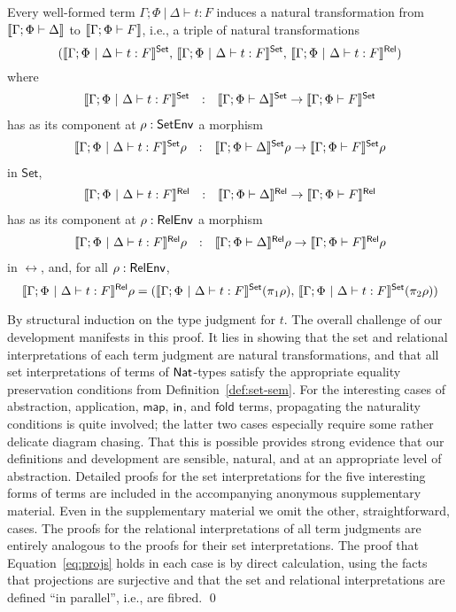 \documentclass{lmcs}
\theoremstyle{plain}\newtheorem{satz}[thm]{Satz}
\newcommand{\fold}{\mathsf{fold}}
\newcommand{\set}{\mathsf{Set}}
\newcommand{\map}{\mathsf{map}}
\begin{document}
\begin{thm}\label{thm:at-gen}
Every well-formed term $\Gamma;\Phi~|~\Delta \vdash t : F$ induces
a natural transformation from $\llbracket{\Gamma; \Phi \vdash \Delta}\rrbracket$ to
$\llbracket{\Gamma; \Phi \vdash F}\rrbracket$, i.e., a triple of natural
transformations 
\[(\setsem{\Gamma;\Phi~|~\Delta \vdash t : F},\,
\setsem{\Gamma;\Phi~|~\Delta \vdash t : F},\,
\relsem{\Gamma;\Phi~|~\Delta \vdash t : F})\]
where
\[\begin{array}{lll}
\setsem{\Gamma;\Phi~|~\Delta \vdash t : F} & : & \setsem{\Gamma;
  \Phi \vdash \Delta} \to \setsem{\Gamma; \Phi \vdash F}
\end{array}\]
has as its component at $\rho : \mathsf{SetEnv}$ a morphism
\[\begin{array}{lll}
\setsem{\Gamma;\Phi~|~\Delta \vdash t : F}\rho & : & \setsem{\Gamma;
  \Phi \vdash \Delta}\rho \to \setsem{\Gamma; \Phi \vdash F}\rho
\end{array}\]
in $\set$,
\[\begin{array}{lll}
\llbracket{\Gamma;\Phi~|~\Delta \vdash t : F}\rrbracket^{\mathsf{Rel}} & : & \llbracket{\Gamma;
  \Phi \vdash \Delta}\rrbracket^{\mathsf{Rel}} \to \llbracket{\Gamma; \Phi \vdash F}\rrbracket^{\mathsf{Rel}}
\end{array}\]
has as its component at $\rho : \mathsf{RelEnv}$ a morphism
\[\begin{array}{lll}
\llbracket{\Gamma;\Phi~|~\Delta \vdash t : F}\rrbracket^{\mathsf{Rel}}\rho & : & \llbracket{\Gamma;
  \Phi \vdash \Delta}\rrbracket^{\mathsf{Rel}}\rho \to \llbracket{\Gamma; \Phi \vdash F}\rrbracket^{\mathsf{Rel}}\rho
\end{array}\]
in $\rel$,
and, for all $\rho : \mathsf{RelEnv}$,
\begin{equation}\label{eq:projs}
\relsem{\Gamma;\Phi~|~\Delta \vdash t : F}\rho =
(\setsem{\Gamma;\Phi~|~\Delta \vdash t : F}(\pi_1 \rho),\,
\setsem{\Gamma;\Phi~|~\Delta \vdash t : F}(\pi_2 \rho))
\end{equation}
\end{thm}
\proof
By structural induction on the type judgment for $t$. The overall
challenge of our development manifests in this proof. It lies in
showing that the set and relational interpretations of each term
judgment are natural transformations, and that all set interpretations
of terms of $\mathsf{Nat}$-types satisfy the appropriate equality preservation
conditions from Definition~\ref{def:set-sem}.  For the interesting
cases of abstraction, application, $\map$, $\mathsf{in}$, and $\fold$ terms,
propagating the naturality conditions is quite involved; the latter
two cases especially require some rather delicate diagram
chasing. That this is possible provides strong evidence that our
definitions and development are sensible, natural, and at an
appropriate level of abstraction. Detailed proofs for the set
interpretations for the five interesting forms of terms are included
in the accompanying anonymous supplementary material. Even in the
supplementary material we omit the other, straightforward, cases.  The
proofs for the relational interpretations of all term judgments are
entirely analogous to the proofs for their set interpretations. The
proof that Equation~\ref{eq:projs} holds in each case is by direct
calculation, using the facts that projections are surjective and that
the set and relational interpretations are defined ``in parallel'',
i.e., are fibred.
\qed
\end{document}
